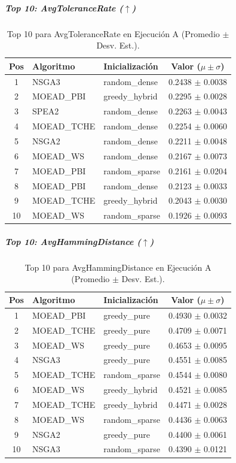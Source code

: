 \subparagraph{Top 10: AvgToleranceRate ($\uparrow$)}
\begin{table}[H]
    \centering
    \begin{tabular}{cllc}
        \toprule
        Pos & Algoritmo & Inicialización & Valor ($\mu \pm \sigma$) \\
        \midrule
        1 & NSGA3 & random\_dense & 0.2438 $\pm$ 0.0038 \\
        2 & MOEAD\_PBI & greedy\_hybrid & 0.2295 $\pm$ 0.0028 \\
        3 & SPEA2 & random\_dense & 0.2263 $\pm$ 0.0043 \\
        4 & MOEAD\_TCHE & random\_dense & 0.2254 $\pm$ 0.0060 \\
        5 & NSGA2 & random\_dense & 0.2211 $\pm$ 0.0048 \\
        6 & MOEAD\_WS & random\_dense & 0.2167 $\pm$ 0.0073 \\
        7 & MOEAD\_PBI & random\_sparse & 0.2161 $\pm$ 0.0204 \\
        8 & MOEAD\_PBI & random\_dense & 0.2123 $\pm$ 0.0033 \\
        9 & MOEAD\_TCHE & greedy\_hybrid & 0.2043 $\pm$ 0.0030 \\
        10 & MOEAD\_WS & random\_sparse & 0.1926 $\pm$ 0.0093 \\
        \bottomrule
    \end{tabular}
    \caption{Top 10 para AvgToleranceRate en Ejecución A (Promedio $\pm$ Desv. Est.).}
\end{table}

\subparagraph{Top 10: AvgHammingDistance ($\uparrow$)}
\begin{table}[H]
    \centering
    \begin{tabular}{cllc}
        \toprule
        Pos & Algoritmo & Inicialización & Valor ($\mu \pm \sigma$) \\
        \midrule
        1 & MOEAD\_PBI & greedy\_pure & 0.4930 $\pm$ 0.0032 \\
        2 & MOEAD\_TCHE & greedy\_pure & 0.4709 $\pm$ 0.0071 \\
        3 & MOEAD\_WS & greedy\_pure & 0.4653 $\pm$ 0.0095 \\
        4 & NSGA3 & greedy\_pure & 0.4551 $\pm$ 0.0085 \\
        5 & MOEAD\_TCHE & random\_sparse & 0.4544 $\pm$ 0.0080 \\
        6 & MOEAD\_WS & greedy\_hybrid & 0.4521 $\pm$ 0.0085 \\
        7 & MOEAD\_TCHE & greedy\_hybrid & 0.4471 $\pm$ 0.0028 \\
        8 & MOEAD\_WS & random\_sparse & 0.4436 $\pm$ 0.0063 \\
        9 & NSGA2 & greedy\_pure & 0.4400 $\pm$ 0.0061 \\
        10 & NSGA3 & random\_sparse & 0.4390 $\pm$ 0.0121 \\
        \bottomrule
    \end{tabular}
    \caption{Top 10 para AvgHammingDistance en Ejecución A (Promedio $\pm$ Desv. Est.).}
\end{table}

